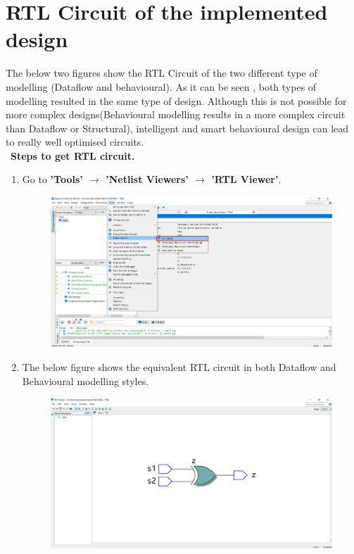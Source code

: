 \documentclass[12pt]{article}
\begin{document}
\section{RTL Circuit of the implemented design}
The below two figures show the RTL Circuit of the two different type of modelling (Dataflow and behavioural). As it can be seen , both types of modelling resulted in the same type of design. Although this is not possible for more complex designs(Behavioural modelling results in a more complex circuit than Dataflow or Structural), intelligent and smart behavioural design can lead to really well optimised circuits.\vspace{1cm}
\\\
    \textbf{Steps to get RTL circuit.}
    \vspace{4mm}
        \begin{enumerate}
            \item Go to \textbf{'Tools' $\rightarrow$  'Netlist Viewers' $\rightarrow$ 'RTL Viewer'}.
            \vspace{6mm}
                \begin{figure}[H]
                     \centering
                    \includegraphics[scale=0.35]{TWSRTL1.png}
                \end{figure}
                \newpage
            \item The below figure shows the equivalent RTL circuit in both Dataflow and Behavioural modelling styles.      
\begin{figure}[H]
    \centering
    \includegraphics[scale=0.35]{TWSRTL2.png}

\end{figure}
\end{enumerate}
\end{document}
